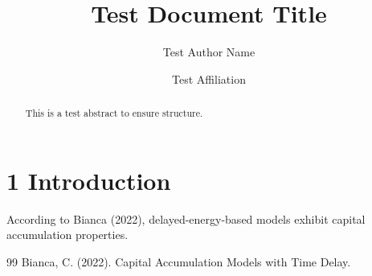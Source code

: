 \documentclass{default}
\begin{document}
\journalheader

\title{Test Document Title}
\author{Test Author Name \and Test Affiliation}
\date{}
\maketitle

\begin{abstract}
This is a test abstract to ensure structure.
\end{abstract}

\section{1 Introduction}

According to Bianca (2022), delayed-energy-based models exhibit capital accumulation properties.

\begin{thebibliography}{99}
Bianca, C. (2022). Capital Accumulation Models with Time Delay.

\end{thebibliography}
\end{document}
